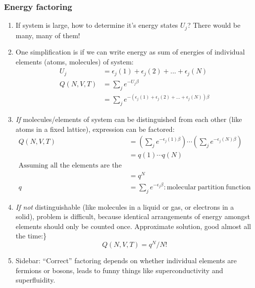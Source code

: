 \documentclass[11pt]{article}
\begin{document}
\subsubsection{Energy factoring}
\label{sec:org52b0b13}
\begin{enumerate}
\item If system is large, how to determine it's energy states \(U_j\)?  There
would be many, many of them!
\item One simplification is if we can write energy as sum of energies of
individual elements (atoms, molecules) of system:
\begin{align}
  U_j&=\epsilon_j(1)+\epsilon_j(2) + ... + \epsilon_j(N) \\
  Q(N,V,T) &= \sum_j e^{-U_j\beta} \\
  &=\sum_je^{-(\epsilon_j(1)+\epsilon_j(2) + ... + \epsilon_j(N))\beta}
\end{align}
\item \emph{If} molecules/elements of system can be distinguished from each
other (like atoms in a fixed lattice), expression can be factored:
   \begin{align}
     Q(N,V,T)&=\left ( \sum_j e^{-\epsilon_j(1)\beta}\right )\cdots \left ( \sum_j
       e^{-\epsilon_j(N)\beta}\right ) \\
   &= q(1)\cdots q(N) \\
   \text{Assuming all the elements are the same:}\\
   &= q^N \\
  q&=\sum_j e^{-\epsilon_j \beta}: \mathrm{molecular\ partition\ function}
\end{align}
\item \emph{If not} distinguishable (like molecules in a liquid or gas, or
electrons in a solid), problem is difficult, because identical
arrangements of energy amongst elements should only be counted once.
Approximate solution, good almost all the time:\}
\begin{equation}
  Q(N,V,T)=q^N/N!
\end{equation}
\item Sidebar: ``Correct'' factoring depends on whether individual elements are fermions or bosons, leads to funny things like superconductivity and superfluidity.
\end{enumerate}
\end{document}
